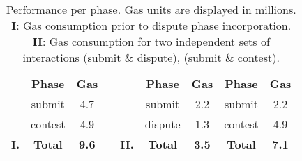 \begin{table}[]
\begin{tabular}{ccccccc|cc}
            & \textbf{Phase} & \textbf{Gas} &  &              & \textbf{Phase} & \textbf{Gas} & \textbf{Phase} & \textbf{Gas} \\ \cline{2-3} \cline{6-9}
 & submit  & 4.7 &  &  & submit  & 2.2 & submit  & 2.2 \\
 & contest & 4.9 &  &  & dispute & 1.3 & contest & 4.9 \\ \cline{2-3} \cline{6-9}
\textbf{I.} & \textbf{Total} & \textbf{9.6} &  & \textbf{II.} & \textbf{Total} & \textbf{3.5} & \textbf{Total} & \textbf{7.1}
\end{tabular}

\caption{Performance per phase. Gas units are displayed in millions.
\textbf{I}: Gas consumption prior to dispute phase incorporation. \textbf{II}:
Gas consumption for two independent sets of interactions (submit \& dispute),
(submit \& contest).}

\label{tab:dispute-cost}
\end{table}

